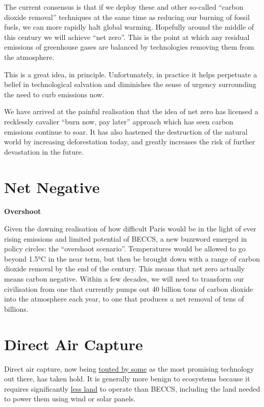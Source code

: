 \documentclass[
]{book}
\begin{document}
The current consensus is that if we deploy these and other so-called ``carbon dioxide removal'' techniques at the same time as reducing our burning of fossil fuels, we can more rapidly halt global warming. Hopefully around the middle of this century we will achieve ``net zero''. This is the point at which any residual emissions of greenhouse gases are balanced by technologies removing them from the atmosphere.

This is a great idea, in principle. Unfortunately, in practice it helps perpetuate a belief in technological salvation and diminishes the sense of urgency surrounding the need to curb emissions now.

We have arrived at the painful realisation that the idea of net zero has licensed a recklessly cavalier ``burn now, pay later'' approach which has seen carbon emissions continue to soar. It has also hastened the destruction of the natural world by increasing deforestation today, and greatly increases the risk of further devastation in the future.

\hypertarget{net-negative}{%
\section{Net Negative}\label{net-negative}}

\textbf{Overshoot}

Given the dawning realisation of how difficult Paris would be in the light of ever rising emissions and limited potential of BECCS, a new buzzword emerged in policy circles: the ``overshoot scenario''. Temperatures would be allowed to go beyond 1.5°C in the near term, but then be brought down with a range of carbon dioxide removal by the end of the century. This means that net zero actually means carbon negative. Within a few decades, we will need to transform our civilisation from one that currently pumps out 40 billion tons of carbon dioxide into the atmosphere each year, to one that produces a net removal of tens of billions.

\hypertarget{direct-air-capture}{%
\section{Direct Air Capture}\label{direct-air-capture}}

Direct air capture, now being \href{https://www.wri.org/blog/2020/03/to-unlock-the-potential-of-direct-air-capture-we-must-invest-now}{touted by some} as the most promising technology out there, has taken hold. It is generally more benign to ecosystems because it requires significantly \href{https://hoffmanncentre.chathamhouse.org/article/betting-on-beccs-exploring-land-based-negative-emissions-technologies/}{less land} to operate than BECCS, including the land needed to power them using wind or solar panels.
\end{document}
